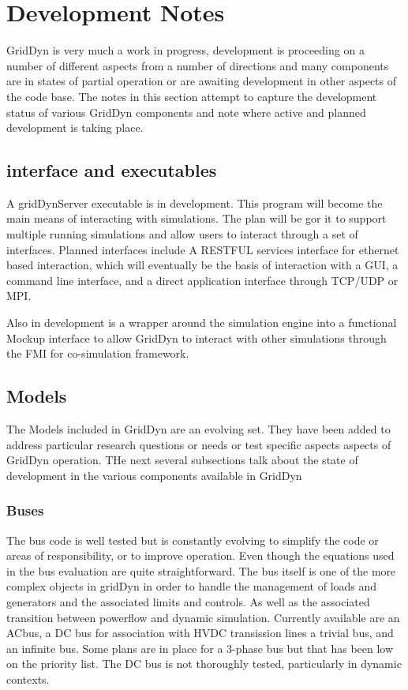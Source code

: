 \documentclass[12pt]{article} %
\begin{document}
\section{Development Notes}
GridDyn is very much a work in progress,  development is proceeding on a number of different aspects from a number of directions and many components are in states of partial operation or are awaiting development in other aspects of the code base.  The notes in this section attempt to capture the development status of various GridDyn components and note where active and planned development is taking place.
\subsection{interface and executables}
A gridDynServer executable is in development.  This program will become the main means of interacting with simulations.  The plan will be gor it to support multiple running simulations and allow users to interact through a set of interfaces.  Planned interfaces include A RESTFUL services interface for ethernet based interaction, which will eventually be the basis of interaction with a GUI, a command line interface, and a direct application interface through TCP/UDP or MPI.

Also in development is a wrapper around the simulation engine into a functional Mockup interface to allow GridDyn to interact with other simulations through the FMI for co-simulation framework.

\subsection{Models}
The Models included in GridDyn are an evolving set.  They have been added to address particular research questions or needs or test specific aspects aspects of GridDyn operation.  THe next several subsections talk about the state of development in the various components available in GridDyn
\subsubsection{Buses}
The bus code is well tested but is constantly evolving to simplify the code or areas of responsibility, or to improve operation.  Even though the equations used in the bus evaluation are quite straightforward.  The bus itself is one of the more complex objects in gridDyn in order to handle the management of loads and generators and the associated limits and controls.  As well as the associated transition between powerflow and dynamic simulation.  Currently available are an ACbus, a DC bus for association with HVDC transission lines a trivial bus, and an infinite bus.  Some plans are in place for a 3-phase bus but that has been low on the priority list.  The DC bus is not thoroughly tested, particularly in dynamic contexts.
\end{document}
